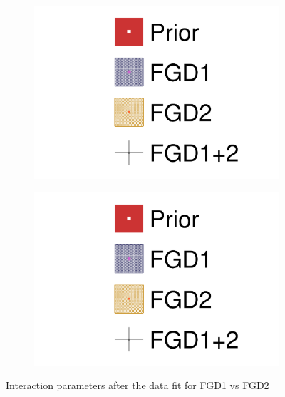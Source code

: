 \begin{figure}[h]
	\begin{subfigure}[t]{0.49\textwidth}
		\includegraphics[width=\textwidth, trim={0mm 0mm 0mm 0mm}, clip,page=20]{figures/mach3/data/alt/2017b_FGD1_Data_merge_2017b_FGD2_Data_merge_2017b_NewData_NewDet_UpdXsecStep_2Xsec_4Det_5Flux_0}
	\end{subfigure}
	\begin{subfigure}[t]{0.49\textwidth}
		\includegraphics[width=\textwidth, trim={0mm 0mm 0mm 0mm}, clip,page=21]{figures/mach3/data/alt/2017b_FGD1_Data_merge_2017b_FGD2_Data_merge_2017b_NewData_NewDet_UpdXsecStep_2Xsec_4Det_5Flux_0}
	\end{subfigure}
	\caption{Interaction parameters after the data fit for FGD1 vs FGD2}
	\label{fig:xsec_data_fdg1vsfgd2}
\end{figure}


